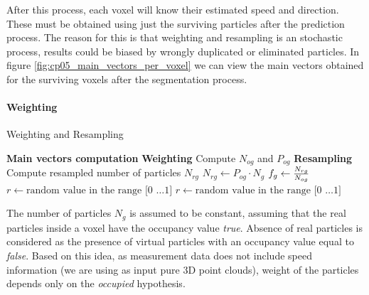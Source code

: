 After this process, each voxel will know their estimated speed and direction. These must be obtained using just the surviving particles after the prediction process. The reason for this is that weighting and resampling is an stochastic process, results could be biased by wrongly duplicated or eliminated particles. In figure \ref{fig:cp05_main_vectors_per_voxel} we can view the main vectors obtained for the surviving voxels after the segmentation process.


\paragraph{Weighting}\label{ch:chapter05_01_04_02_02}

\begin{algorithm}[p]
\caption{Weighting and Resampling}
\label{alg:cp05_weighting_resampling}
\begin{algorithmic}
    \State \textbf{Main vectors computation}
      \State {}
    \State
    \State \textbf{Weighting}
      \State \indent Compute $N_{og}$ and $P_{og}$
      \State
    \State \textbf{Resampling}
      \State \indent Compute resampled number of particles $N_{rg}$
      \State \indent $N_{rg} \gets P_{og} \cdot N_g$
      \State \indent $f_g \gets {{N_{rg}} \over {N_{og}}}$
      \State {}
	 
	 
	\EndFor
	\State $r \gets \text{random value in the range [0 \ldots 1]}$
	\EndIf
      \State {}
      \Else 
	\State $r \gets \text{random value in the range [0 \ldots 1]}$
	\EndIf
      \EndIf
    \EndFor
  \EndFor
\EndFunction
\end{algorithmic}
\end{algorithm}

The number of particles $N_g$ is assumed to be constant, assuming that the real particles inside a voxel have the occupancy value \emph{true}. Absence of real particles is considered as the presence of virtual particles with an occupancy value equal to \emph{false}. Based on this idea, as measurement data does not include speed information (we are using as input pure 3D point clouds), weight of the particles depends only on the \emph{occupied} hypothesis.

